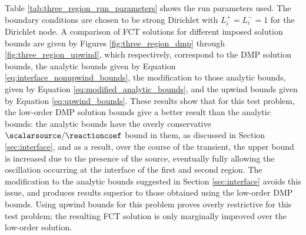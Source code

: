 \begin{table}[htb]
\end{table}

Table \ref{tab:three_region_run_parameters} shows the run parameters used.
The boundary conditions are chosen to be strong Dirichlet with $L_i^+=L_i^-=1$
for the Dirichlet node. A comparison of FCT solutions for different imposed
solution bounds are given by Figures \ref{fig:three_region_dmp} through
\ref{fig:three_region_upwind}, which respectively, correspond to the
DMP solution bounds, the analytic bounds given by Equation
\eqref{eq:interface_nonupwind_bounds},
the modification to those analytic bounds, given by Equation
\eqref{eq:modified_analytic_bounds}, and the upwind bounds given by Equation
\eqref{eq:upwind_bounds}. These results show that for this test problem,
the low-order DMP solution bounds
give a better result than the analytic bounds: the analytic bounds have the
overly conservative $\scalarsource/\reactioncoef$ bound in them, as discussed
in Section \ref{sec:interface}, and as a result, over the course of the transient,
the upper bound is increased due to the presence of the source, eventually fully
allowing the oscillation occurring at the interface of the first and second
region. The modification to the analytic bounds suggested in Section
\ref{sec:interface} avoids this issue, and produces results superior to those
obtained using the low-order DMP bounds. Using upwind bounds for this problem
proves overly restrictive for this test problem; the resulting FCT solution
is only marginally improved over the low-order solution.


